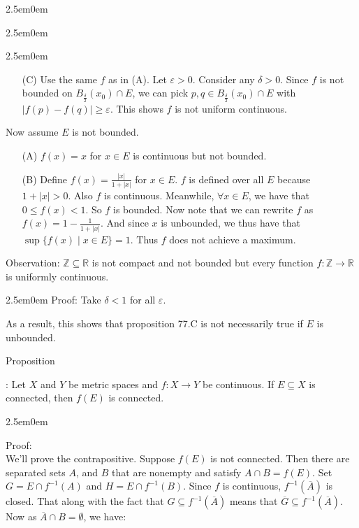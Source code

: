 \documentclass{book}
\newcommand{\hTwo}{%
   \color{MidnightBlue}%
   \fontsize{13}{15}\selectfont%
}
\newcommand{\hThree}{%
   \color{PineGreen}
   \fontsize{13}{15}\selectfont%
}
\newcommand{\exOne}{%
   \color{Purple}%
   \fontsize{14}{16}\selectfont%
}
\newcommand{\exTwo}{%
   \color{RedViolet}%
   \fontsize{13}{15}\selectfont%
}
\newenvironment{myIndent}{%
   \begin{adjustwidth}{2.5em}{0em}%
}{%
   \end{adjustwidth}%
}
\newcommand{\retTwo}{\hfill\bigbreak}
\newcounter{PropNumber}
\newcommand{\propCount}[1][1]{%
   \addtocounter{PropNumber}{#1}%
   \thePropNumber%
}
\begin{document}
{\begin{myIndent}
{\begin{myIndent}
\begin{myIndent}
\begin{itemize}
               \newpage

               \item[(C)] Use the same $f$ as in (A). Let $\varepsilon > 0$. Consider any $\delta > 0$. Since $f$ is not bounded on $B_\frac{\delta}{2}(x_0) \cap E$, we can pick $p, q \in B_\frac{\delta}{2}(x_0) \cap E$ with $|f(p) - f(q)| \geq \varepsilon$. This shows $f$ is not uniform continuous. \retTwo
            \end{itemize}
         \end{myIndent}

         Now assume $E$ is not bounded.
         \begin{itemize}
            \item[(A)] $f(x) = x$ for $x \in E$ is continuous but not bounded. \retTwo
            
            \item[(B)] Define $f(x) = \frac{|x|}{1 + |x|}$ for $x \in E$. $f$ is defined over all $E$ because $1 + |x| > 0$. Also $f$ is continuous. Meanwhile, $\forall x \in E$, we have that $0 \leq f(x) < 1$. So $f$ is bounded. Now note that we can rewrite $f$ as $f(x) = 1 - \frac{1}{1 + |x|}$. And since $x$ is unbounded, we thus have that $\sup\{f(x) \mid x \in E\} = 1$. Thus $f$ does not achieve a maximum. \retTwo
         \end{itemize}
      \end{myIndent}}

      \exOne%
      Observation: $\mathbb{Z} \subseteq \mathbb{R}$ is not compact and not bounded but every function $f: \mathbb{Z} \rightarrow \mathbb{R}$ is uniformly continuous.
      \begin{myIndent}\exTwo%
         Proof: Take $\delta < 1$ for all $\varepsilon$. \retTwo
      \end{myIndent}

      As a result, this shows that proposition 77.C is not necessarily true if $E$ is\\ unbounded. \retTwo

      \hTwo%
      Proposition \propCount: Let $X$ and $Y$ be metric spaces and $f: X \rightarrow Y$ be continuous. If $E \subseteq X$ is connected, then $f(E)$ is connected.
      {\begin{myIndent} \hThree
         Proof:\\
         We'll prove the contrapositive. Suppose $f(E)$ is not connected. Then there are separated sets $A$, and $B$ that are nonempty and satisfy $A \cap B = f(E)$. Set $G = E \cap f^{-1}(A)$ and $H = E \cap f^{-1}(B)$. Since $f$ is continuous, $f^{-1}(\overbar{A})$ is closed. That along with the fact that $G \subseteq f^{-1}(\overbar{A})$ means that $\overbar{G} \subseteq f^{-1}(\overbar{A})$. Now as $\overbar{A} \cap B = \emptyset$, we have: 
         

\end{myIndent}}
\end{myIndent}}
\end{document}
